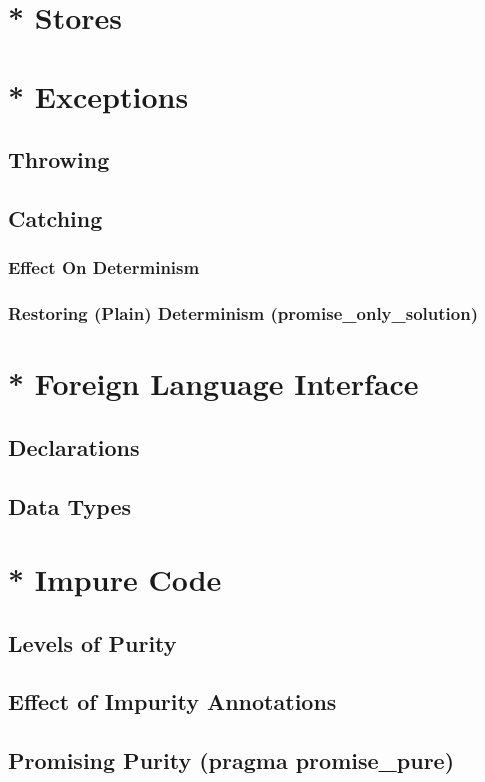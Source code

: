 \documentclass[a4paper,11pt,notitlepage,onecolumn]{article}
\begin{document}
\section{* Stores}



\section{* Exceptions}
\subsection{Throwing}
\subsection{Catching}
\subsubsection{Effect On Determinism}
\subsubsection{Restoring (Plain) Determinism (promise\_only\_solution)}



\section{* Foreign Language Interface}
\subsection{Declarations}
\subsection{Data Types}



\section{* Impure Code}
\subsection{Levels of Purity}
\subsection{Effect of Impurity Annotations}
\subsection{Promising Purity (pragma promise\_pure)}
\end{document}
